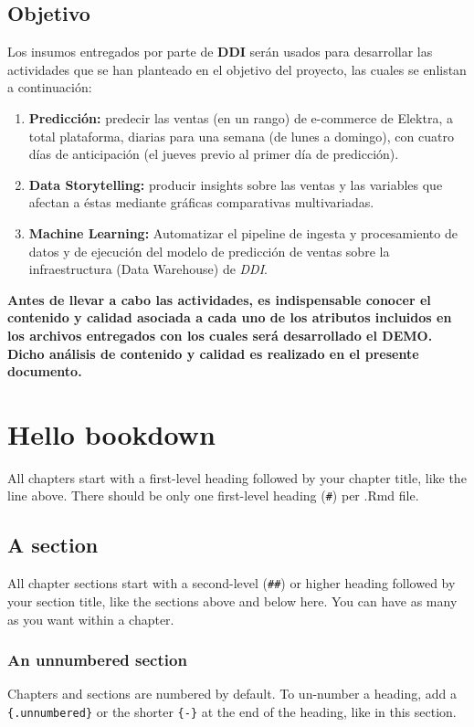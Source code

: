 \documentclass[
]{book}
\begin{document}
\hypertarget{objetivo}{%
\section*{Objetivo}\label{objetivo}}

Los insumos entregados por parte de \textbf{DDI} serán usados para desarrollar las actividades que se han planteado en el objetivo del proyecto, las cuales se enlistan a continuación:

\begin{enumerate}
\def\labelenumi{\arabic{enumi}.}
\item
  \textbf{Predicción:} predecir las ventas (en un rango) de e-commerce de Elektra, a total plataforma, diarias para una semana (de lunes a domingo), con cuatro días de anticipación (el jueves previo al primer día de predicción).
\item
  \textbf{Data Storytelling:} producir insights sobre las ventas y las variables que afectan a éstas mediante gráficas comparativas multivariadas.
\item
  \textbf{Machine Learning:} Automatizar el pipeline de ingesta y procesamiento de datos y de ejecución del modelo de predicción de ventas sobre la infraestructura (Data Warehouse) de \emph{DDI}.
\end{enumerate}

\textbf{Antes de llevar a cabo las actividades, es indispensable conocer el contenido y calidad asociada a cada uno de los atributos incluidos en los archivos entregados con los cuales será desarrollado el DEMO. Dicho análisis de contenido y calidad es realizado en el presente documento.}

\hypertarget{hello-bookdown}{%
\chapter{Hello bookdown}\label{hello-bookdown}}

All chapters start with a first-level heading followed by your chapter title, like the line above. There should be only one first-level heading (\texttt{\#}) per .Rmd file.

\hypertarget{a-section}{%
\section{A section}\label{a-section}}

All chapter sections start with a second-level (\texttt{\#\#}) or higher heading followed by your section title, like the sections above and below here. You can have as many as you want within a chapter.

\hypertarget{an-unnumbered-section}{%
\subsection*{An unnumbered section}\label{an-unnumbered-section}}

Chapters and sections are numbered by default. To un-number a heading, add a \texttt{\{.unnumbered\}} or the shorter \texttt{\{-\}} at the end of the heading, like in this section.

  
\end{document}
